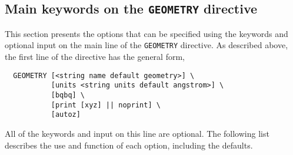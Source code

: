 \subsection{Main keywords on the {\tt GEOMETRY} directive}

This section presents the options that can be specified using the keywords 
and optional input on the main line of the {\tt GEOMETRY} directive.
As described above, the first line of the directive has the general form,
\begin{verbatim}
  GEOMETRY [<string name default geometry>] \
           [units <string units default angstrom>] \
           [bqbq] \
           [print [xyz] || noprint] \
           [autoz]
\end{verbatim}
    
All of the keywords and input on this line are optional.  The following
list describes the use and function of each option, including the defaults.

